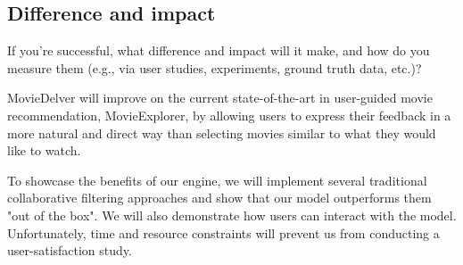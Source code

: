 \subsection{Difference and impact}
If you're successful, what difference and impact will it make, and how do you measure them (e.g., via user studies, experiments, ground truth data, etc.)?

MovieDelver will improve on the current state-of-the-art in user-guided movie recommendation, MovieExplorer, by allowing users to express their feedback in a  more natural and direct way than selecting movies similar to what they would like to watch. 

To showcase the benefits of our engine, we will implement several traditional collaborative filtering approaches and show that our model outperforms them "out of the box". We will also demonstrate how users can interact with the model. Unfortunately, time and resource constraints will prevent us from conducting a user-satisfaction study. 
